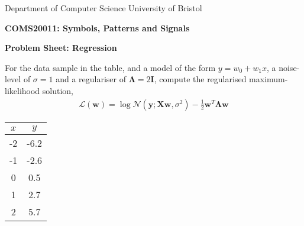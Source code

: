 \documentclass [11pt]{article}
\begin{document}
Department of Computer Science \hfill University of Bristol

\begin{center}
{\large\bf COMS20011: Symbols, Patterns and Signals}
\vspace{2ex}

{\large\bf Problem Sheet: Regression}
\end{center}
\vspace{1ex}

For the data sample in the table, and a model of the form $y=w_0 + w_1 x$, a noise-level of $\sigma=1$ and a regulariser of $\mathbf{\Lambda} = 2 \mathbf{I}$, compute the regularised maximum-likelihood solution,
\begin{align}
  \mathcal{L}(\mathbf{w}) = \log \mathcal{N}(\mathbf{y}; \mathbf{Xw}, \sigma^2) - \tfrac{1}{2} \mathbf{w}^T \mathbf{\Lambda w}
\end{align}


\begin{table}[h]
\centering
\begin{tabular}{cc}
  $x$ & $y$\\
  \hline
  -2 & -6.2\\
  -1 & -2.6\\
   0 &  0.5\\
   1 &  2.7\\
   2 &  5.7
\end{tabular}
\end{table}
\end{document}

